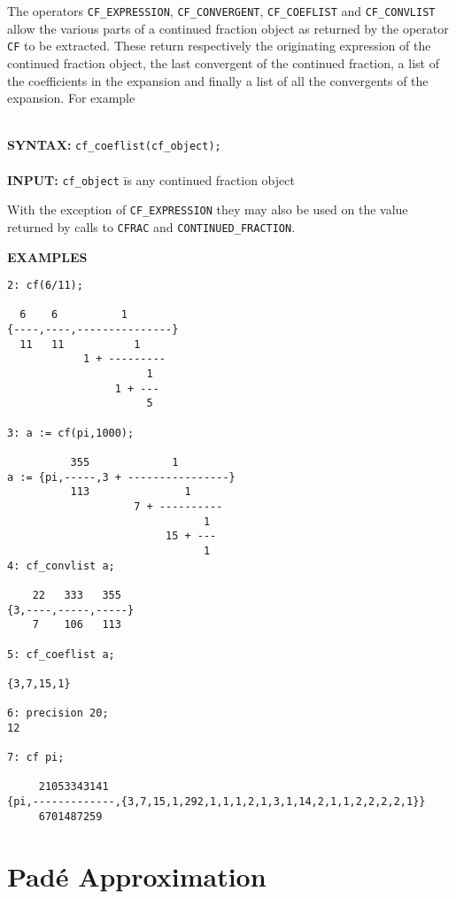 The operators \texttt{CF\_EXPRESSION}, \texttt{CF\_CONVERGENT},
\texttt{CF\_COEFLIST} and \texttt{CF\_CONVLIST} allow the various
parts of a continued fraction object as returned by the operator
\texttt{CF} to be extracted. These return respectively the originating
expression of the continued fraction object, the last convergent of the
continued fraction, a list of the coefficients in the expansion and finally
a list of all the convergents of the expansion.
For example
\begin{tabbing}
\\
{\bf SYNTAX:} \hspace{5mm} 
\= {\tt cf\_coeflist(cf\_object);}\\\\

{\bf INPUT:}
\> {\tt cf\_object} \hspace{3mm} \= is any continued fraction object \\ 
\end{tabbing}

With the exception of \texttt{CF\_EXPRESSION} they may also be used on the
value returned by calls to 
\texttt{CFRAC} and \texttt{CONTINUED\_FRACTION}. 
 
\large{\textbf{EXAMPLES}}
\begin{verbatim}
2: cf(6/11);

  6    6          1
{----,----,---------------}
  11   11           1
            1 + ---------
                      1
                 1 + ---
                      5

3: a := cf(pi,1000);

          355             1
a := {pi,-----,3 + ----------------}
          113               1
                    7 + ----------
                               1
                         15 + ---
                               1
4: cf_convlist a;

    22   333   355
{3,----,-----,-----}
    7    106   113

5: cf_coeflist a;

{3,7,15,1}

6: precision 20;
12

7: cf pi;

     21053343141
{pi,-------------,{3,7,15,1,292,1,1,1,2,1,3,1,14,2,1,1,2,2,2,2,1}}
     6701487259

\end{verbatim}


\section{Pad\'{e} Approximation}


